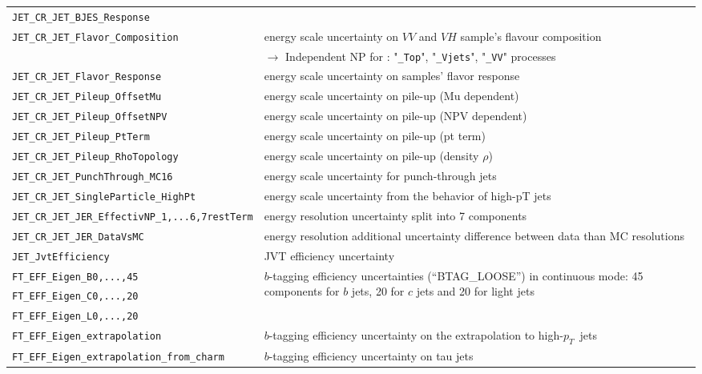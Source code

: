 \begin{table}
{\begin{tabular}{ll}
      \texttt{JET\_CR\_JET\_BJES\_Response} &  \\
      \texttt{JET\_CR\_JET\_Flavor\_Composition} & energy scale uncertainty on $VV$ and $VH$ sample's flavour composition \\
                                         & {$\rightarrow$ Independent NP for : "\texttt{\_Top}", "\texttt{\_Vjets}", "\texttt{\_VV}" processes } \\
      \texttt{JET\_CR\_JET\_Flavor\_Response} & energy scale uncertainty on samples' flavor response \\
      \texttt{JET\_CR\_JET\_Pileup\_OffsetMu} & energy scale uncertainty on pile-up (Mu dependent) \\
      \texttt{JET\_CR\_JET\_Pileup\_OffsetNPV} & energy scale uncertainty on pile-up (NPV dependent) \\
      \texttt{JET\_CR\_JET\_Pileup\_PtTerm} & energy scale uncertainty on pile-up (pt term) \\
      \texttt{JET\_CR\_JET\_Pileup\_RhoTopology} & energy scale uncertainty on pile-up (density $\rho$) \\
      \texttt{JET\_CR\_JET\_PunchThrough\_MC16} & energy scale uncertainty for punch-through jets \\
      \texttt{JET\_CR\_JET\_SingleParticle\_HighPt} & energy scale uncertainty from the behavior of high-pT jets \\
      \texttt{JET\_CR\_JET\_JER\_EffectivNP\_1,...6,7restTerm} & energy resolution uncertainty split into 7 components \\
      \texttt{JET\_CR\_JET\_JER\_DataVsMC} & energy resolution additional uncertainty difference between data than MC resolutions \\
      \texttt{JET\_JvtEfficiency} & JVT efficiency uncertainty \\
      \texttt{FT\_EFF\_Eigen\_B0,...,45} & \multirow{3}{*}{\parbox{11cm}{$b$-tagging efficiency uncertainties (``BTAG\_LOOSE'') in continuous mode: 45 components for $b$ jets, 20 for $c$ jets and 20 for light jets}} \\
      \texttt{FT\_EFF\_Eigen\_C0,...,20} &\\
      \texttt{FT\_EFF\_Eigen\_L0,...,20} &\\
      \texttt{FT\_EFF\_Eigen\_extrapolation} & $b$-tagging efficiency uncertainty on the extrapolation to high-$p_T$\ jets \\
      \texttt{FT\_EFF\_Eigen\_extrapolation\_from\_charm} & $b$-tagging efficiency uncertainty on tau jets \\

\end{tabular}}
\end{table}
